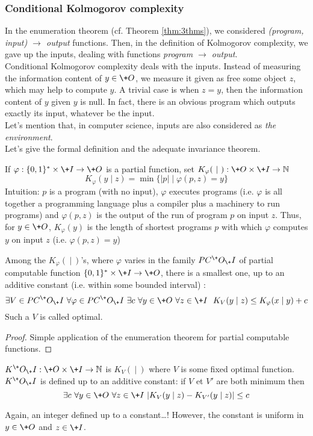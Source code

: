 \subsubsection{Conditional Kolmogorov complexity}
In the enumeration theorem (cf. Theorem \ref{thm:3thms}),
we considered {\em(program, input) $\to$ output} functions.
Then, in the definition of Kolmogorov complexity, we gave up
the inputs, dealing with functions {\em program $\to$ output}.
\\
Conditional Kolmogorov complexity deals with the inputs. 
Instead of measuring the information content of $y\in\+O$,
we measure it given as free some object $z$, which may help
to compute $y$.
A trivial case is when $z=y$, then the information content
of $y$ given $y$ is null. In fact, there is an obvious program
which outputs exactly its input, whatever be the input.
\\
Let's mention that, in computer science, inputs are also
considered as {\em the environment}.
\\
Let's give the formal definition and the adequate
invariance theorem.
\begin{definition}\label{def:condKphi}
If $\varphi:{\{0,1\}^*}\times\+I\to\+O$ is a partial function,
set $K_\varphi(\ \mid\ ) : \+O\times\+I \to {\mathbb N}$
$$
K_\varphi(y \mid z)=\min\{|p| \mid \varphi(p,z)=y\}
$$
Intuition:
$p$ is a program (with no input),
$\varphi$ executes programs
(i.e. $\varphi$ is all together
a programming language
plus a compiler
plus a machinery to run programs)
and $\varphi(p,z)$ is the output of the run of program $p$
on input $z$.
Thus, for $y\in\+O$, $K_\varphi(y)$ is the length of shortest
programs $p$ with which $\varphi$ computes $y$ on input $z$
(i.e. $\varphi(p,z)=y$)
\end{definition}
\begin{theorem}
Among the $K_\varphi(\ |\ )$'s, where $\varphi $ varies
in the family $PC^\+O_\+I$
of partial computable function ${\{0,1\}^*}\times \+I\to\+O$,
there is a smallest one, up to an additive constant
(i.e. within some bounded interval) :
$$
\exists V\in PC^\+O_\+I\ \forall \varphi\in PC^\+O_\+I\
\exists c\ \forall y\in\+O\ \forall z\in\+I\ \
K_V(y\mid z) \leq K_\varphi(x\mid y) + c
$$
Such a $V$ is called optimal.
\end{theorem}
\begin{proof}
Simple application of the enumeration theorem
for partial computable functions.
\end{proof}
\begin{definition}
$K^\+O_\+I:\+O\times\+I\to{\mathbb N}$ is $K_V(\ |\ )$ where $V$
is some fixed optimal function.
\medskip\\
$K^\+O_\+I$ is defined up to an additive constant:
if $V$ et $V'$ are both minimum then
$$
\exists c\ \forall y\in\+O\ \forall z\in\+I\
|K_V(y\mid z) - K_{V'}(y\mid z)| \leq c
$$
\end{definition}
\noindent
Again, an integer defined up to a constant\ldots!
However, the constant is uniform in $y\in\+O$ and $z\in\+I$.
